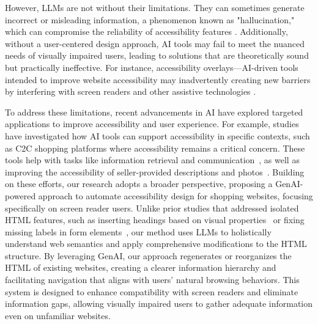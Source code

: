 However, LLMs are not without their limitations. They can sometimes generate incorrect or misleading information, a phenomenon known as "hallucination," which can compromise the reliability of accessibility features \cite{bigham2017effects, 10.1145/3663548.3675631}. Additionally, without a user-centered design approach, AI tools may fail to meet the nuanced needs of visually impaired users, leading to solutions that are theoretically sound but practically ineffective. For instance, accessibility overlays—AI-driven tools intended to improve website accessibility may inadvertently creating new barriers by interfering with screen readers and other assistive technologies \cite{10.1007/978-3-031-08645-8_2, 10.1145/3663548.3675650}.

To address these limitations, recent advancements in AI have explored targeted applications to improve accessibility and user experience. For example, studies have investigated how AI tools can support accessibility in specific contexts, such as C2C shopping platforms where accessibility remains a critical concern. These tools help with tasks like information retrieval and communication~\cite{10.1145/3604571.3604586}, as well as improving the accessibility of seller-provided descriptions and photos~\cite{10.1145/3517428.3550390}. Building on these efforts, our research adopts a broader perspective, proposing a GenAI-powered approach to automate accessibility design for shopping websites, focusing specifically on screen reader users. Unlike prior studies that addressed isolated HTML features, such as inserting headings based on visual properties~\cite{10.1145/1866029.1866041} or fixing missing labels in form elements~\cite{10.1145/1414471.1414508}, our method uses LLMs to holistically understand web semantics and apply comprehensive modifications to the HTML structure. By leveraging GenAI, our approach regenerates or reorganizes the HTML of existing websites, creating a clearer information hierarchy and facilitating navigation that aligns with users' natural browsing behaviors. This system is designed to enhance compatibility with screen readers and eliminate information gaps, allowing visually impaired users to gather adequate information even on unfamiliar websites.



